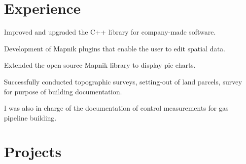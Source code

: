 \documentclass[letterpaper]{deedy-resume} %
\begin{document}
\hfill
%
%
\begin{minipage}[t]{0.66\textwidth} %


\section{Experience}


\vspace{\topsep} %
\begin{tightitemize}
\item Improved and upgraded the C++ library for company-made software. 
\item Development of Mapnik plugins that enable the user to edit spatial data. 
\item Extended the open source Mapnik library to display pie charts.
\end{tightitemize}

\sectionspace %



\begin{tightitemize}
\item Successfully conducted topographic surveys, setting-out of land parcels, survey for purpose of building documentation.
\item I was also in charge of the documentation of control measurements for gas pipeline building. 
\end{tightitemize}

\sectionspace %


\section{Projects}


\end{minipage}
\end{document}
